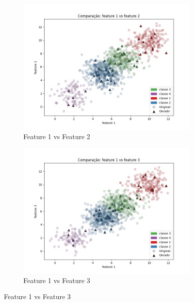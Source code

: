 \begin{enumerate}
    \begin{figure}[H]
        \centering
        \begin{subfigure}{0.45\textwidth}
            \includegraphics[width=\textwidth]{fig/q1_i6_x1x2.png}
            \caption{Feature 1 vs Feature 2}
            \label{fig:q1_i6_x1x2}
        \end{subfigure}
        \hfill
        \begin{subfigure}{0.45\textwidth}
            \includegraphics[width=\textwidth]{fig/q1_i6_x1x3.png}
            \caption{Feature 1 vs Feature 3}
            \label{fig:q1_i6_x1x3}
        \end{subfigure}
        
        \vspace{0.5cm}
        

\end{figure}
\end{enumerate}
